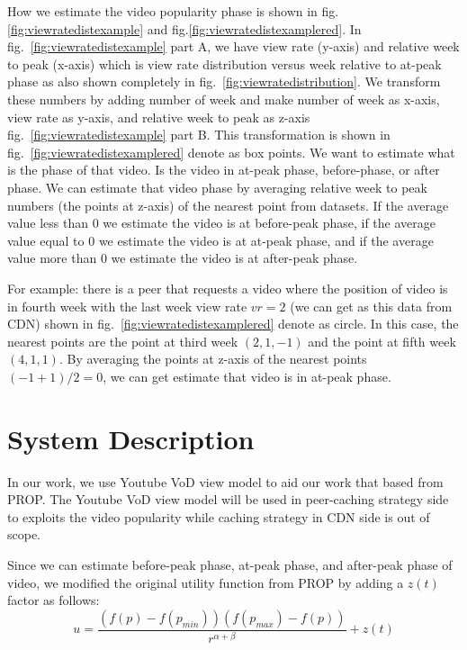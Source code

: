 \documentclass[10pt,final,journal,a4paper]{IEEEtran}
\begin{document}
How we estimate the video popularity phase is shown in fig.\ref{fig:viewratedistexample} and fig.\ref{fig:viewratedistexamplered}.
In fig.~\ref{fig:viewratedistexample} part A, we have view rate (y-axis) and relative week to peak (x-axis) which is view rate distribution versus week relative to at-peak phase as also shown completely in fig.~\ref{fig:viewratedistribution}.
We transform these numbers by adding number of week and make number of week as x-axis, view rate 
as y-axis, and relative week to peak as z-axis fig.~\ref{fig:viewratedistexample} part B.
This transformation is shown in fig.~\ref{fig:viewratedistexamplered} denote as box points.
We want to estimate what is the phase of that video. 
Is the video in at-peak phase, before-phase, or after phase.  
We can estimate that video phase by averaging relative week to peak numbers (the points at z-axis) of the nearest point from datasets. 
If the average value less than $0$ we estimate the video is at before-peak phase, if the average value equal to $0$ we estimate the video is at at-peak phase,  and if the average value more than $0$ we estimate the video is at after-peak phase.

For example: there is a peer that requests a video where the position of video is in fourth week with the last week view rate $vr=2$ (we can get as this data from CDN) shown in fig.~\ref{fig:viewratedistexamplered} denote as circle.
In this case, the nearest points are the point at third week $(2,1,-1)$ and the point at fifth week $(4,1,1)$.  
By averaging the points at z-axis of the nearest points $(-1 + 1)/2 = 0$,  we can get estimate that video is in at-peak phase.



\section{System Description}\label{systemdescription}
In our work, we use Youtube VoD view model to aid our work that based from PROP. 
The Youtube VoD view model will be used in peer-caching strategy side to exploits the video popularity while caching strategy in CDN side is out of scope. 

Since we can estimate before-peak phase, at-peak phase, and after-peak phase of video, we modified the original utility function from PROP by adding a $z(t)$ factor as follows:
\begin{equation}
u = \frac{ (f(p) - f(p_{min})) (f(p_{max}) - f(p)) }{r^{\alpha + \beta}} + z(t)
\end{equation}
\end{document}
